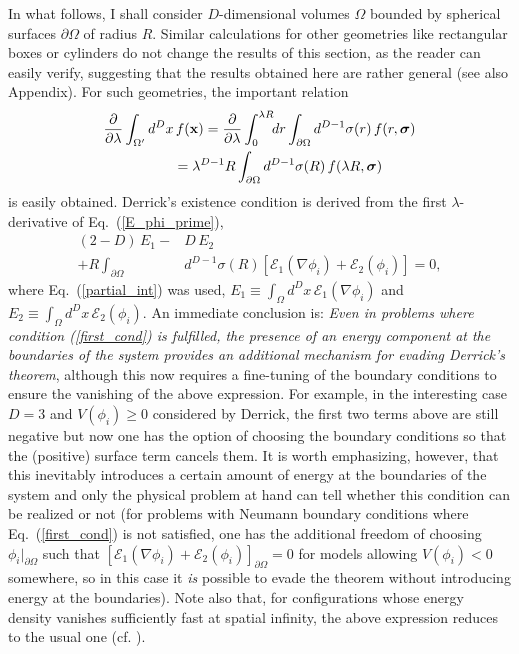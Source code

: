 \documentclass[a4paper,prd,twocolumn,showpacs,amsmath]{revtex4}
\newcommand{\vecx}{{\bf x}}
\newcommand{\vecsigma}{{\bm \sigma}}
\newcommand{\domega}{\partial \Omega}
\newcommand{\E}{{\mathcal E}}
\begin{document}
In what follows, I shall consider $D$-dimensional volumes $\Omega$ bounded by spherical surfaces $\domega$
of radius $R$. Similar calculations for other geometries like rectangular boxes or cylinders do not
change the results of this section, as the reader can easily verify, suggesting that the results obtained
here are rather general (see also Appendix). For such geometries, the important relation
\begin{align} \label{partial_int}
  \frac{\partial}{\partial \lambda} \int_{\Omega'} d^D x & \, f(\vecx) =
    \frac{\partial}{\partial \lambda} \int_0^{\lambda R} \! \! dr \int_{\domega} d^{D-1}\sigma(r) \,f(r,\vecsigma) \nonumber \\
   & = \lambda^{D-1} R \int_{\domega} d^{D-1}\sigma(R) \,f(\lambda R,\vecsigma)
\end{align}
is easily obtained.  Derrick's existence condition is derived from the first $\lambda$-derivative
of Eq.~(\ref{E_phi_prime}),
\begin{align} \label{derrick1}
  (2-D)\,E_1 - & D\,E_2 \nonumber \\
    + R \int_{\domega} & d^{D-1}\sigma(R)\left[\E_1(\nabla \phi_i) + \E_2(\phi_i) \right] = 0,
\end{align}
where Eq.~(\ref{partial_int}) was used, $E_1\equiv\int_\Omega d^D x \,\E_1(\nabla \phi_i)$ and
$E_2\equiv\int_\Omega d^D x \,\E_2(\phi_i)$. An immediate conclusion is: {\em Even in problems
where condition (\ref{first_cond}) is fulfilled, the presence of an energy component at the boundaries
of the system provides an additional mechanism for evading Derrick's theorem}, although this now requires
a fine-tuning of the boundary conditions to ensure the vanishing of the above expression.
For example, in the interesting case $D=3$ and $V(\phi_i)\geq 0$ considered by Derrick,
the first two terms above are still negative but now one has the option of choosing
the boundary conditions so that the (positive) surface term cancels them.
It is worth emphasizing, however, that this inevitably introduces a certain amount of energy
at the boundaries of the system
and only the physical problem at hand can tell whether this condition can be realized or not
(for problems with Neumann boundary conditions where Eq.~(\ref{first_cond}) is not satisfied, one has the
additional freedom of choosing $\phi_i|_{\domega}$ such that
$[\E_1(\nabla\phi_i)+\E_2(\phi_i)]_{\domega}=0$ for models allowing $V(\phi_i)<0$ somewhere, so in this
case it {\em is} possible to evade the theorem without introducing energy at the boundaries). Note also that,
for configurations
whose energy density vanishes sufficiently fast at spatial infinity, the above expression reduces to the
usual one (cf. \cite{rajaraman,coleman-book}).
\end{document}
